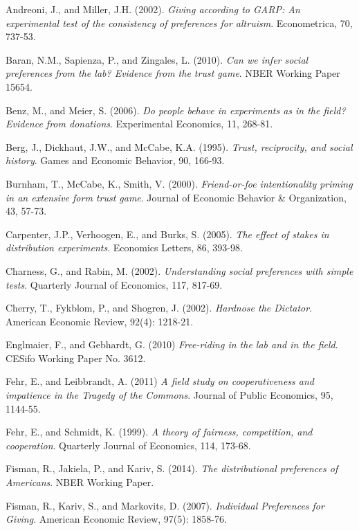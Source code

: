 \documentclass[12pt]{article}
\begin{document}
\begin{thebibliography}{9}

Andreoni, J., and Miller, J.H. (2002).
\textit{Giving according to GARP: An experimental test of the consistency of preferences for altruism}.
Econometrica, 70, 737-53.

Baran, N.M., Sapienza, P., and Zingales, L. (2010).
\textit{Can we infer social preferences from the lab? Evidence from the trust game}.
NBER Working Paper 15654.

Benz, M., and Meier, S. (2006).
\textit{Do people behave in experiments as in the field? Evidence from donations}.
Experimental Economics, 11, 268-81.

Berg, J., Dickhaut, J.W., and McCabe, K.A. (1995).
\textit{Trust, reciprocity, and social history}.
Games and Economic Behavior, 90, 166-93.

Burnham, T., McCabe, K., Smith, V. (2000).
\textit{Friend-or-foe intentionality priming in an extensive form trust game}.
Journal of Economic Behavior \& Organization, 43, 57-73.

Carpenter, J.P., Verhoogen, E., and Burks, S. (2005).
\textit{The effect of stakes in distribution experiments}.
Economics Letters, 86, 393-98.

Charness, G., and Rabin, M. (2002).
\textit{Understanding social preferences with simple tests}.
Quarterly Journal of Economics, 117, 817-69.

Cherry, T., Fykblom, P., and Shogren, J. (2002).
\textit{Hardnose the Dictator}.
American Economic Review, 92(4): 1218-21.

Englmaier, F., and Gebhardt, G. (2010)
\textit{Free-riding in the lab and in the field}.
CESifo Working Paper No. 3612.

Fehr, E., and Leibbrandt, A. (2011)
\textit{A field study on cooperativeness and impatience in the Tragedy of the Commons}.
Journal of Public Economics, 95, 1144-55.

Fehr, E., and Schmidt, K. (1999).
\textit{A theory of fairness, competition, and cooperation}.
Quarterly Journal of Economics, 114, 173-68.

Fisman, R., Jakiela, P., and Kariv, S. (2014).
\textit{The distributional preferences of Americans}.
NBER Working Paper.

Fisman, R., Kariv, S., and Markovits, D. (2007).
\textit{Individual Preferences for Giving}.
American Economic Review, 97(5): 1858-76.


\end{thebibliography}
\end{document}
